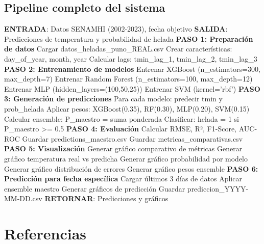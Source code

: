 \documentclass[11pt, a4paper]{article}
\begin{document}
\subsection{Pipeline completo del sistema}

\begin{algorithm}
\caption{Pipeline completo de predicción de heladas}
\begin{algorithmic}[1]
\State \textbf{ENTRADA}: Datos SENAMHI (2002-2023), fecha objetivo
\State \textbf{SALIDA}: Predicciones de temperatura y probabilidad de helada
\State
\State \textbf{PASO 1: Preparación de datos}
\State Cargar datos\_heladas\_puno\_REAL.csv
\State Crear características: day\_of\_year, month, year
\State Calcular lags: tmin\_lag\_1, tmin\_lag\_2, tmin\_lag\_3
\State
\State \textbf{PASO 2: Entrenamiento de modelos}
\State Entrenar XGBoost (n\_estimators=300, max\_depth=7)
\State Entrenar Random Forest (n\_estimators=100, max\_depth=12)
\State Entrenar MLP (hidden\_layers=(100,50,25))
\State Entrenar SVM (kernel='rbf')
\State
\State \textbf{PASO 3: Generación de predicciones}
\State Para cada modelo: predecir tmin y prob\_helada
\State Aplicar pesos: XGBoost(0.35), RF(0.30), MLP(0.20), SVM(0.15)
\State Calcular ensemble: P\_maestro = suma ponderada
\State Clasificar: helada = 1 si P\_maestro >= 0.5
\State
\State \textbf{PASO 4: Evaluación}
\State Calcular RMSE, R², F1-Score, AUC-ROC
\State Guardar predictions\_maestro.csv
\State Guardar metricas\_comparativas.csv
\State
\State \textbf{PASO 5: Visualización}
\State Generar gráfico comparativo de métricas
\State Generar gráfico temperatura real vs predicha
\State Generar gráfico probabilidad por modelo
\State Generar gráfico distribución de errores
\State Generar gráfico pesos ensemble
\State
\State \textbf{PASO 6: Predicción para fecha específica}
\State Cargar últimos 3 días de datos
\State Aplicar ensemble maestro
\State Generar gráficos de predicción
\State Guardar prediccion\_YYYY-MM-DD.csv
\State
\State \textbf{RETORNAR}: Predicciones y gráficos
\end{algorithmic}
\end{algorithm}

\section*{Referencias}
\end{document}
